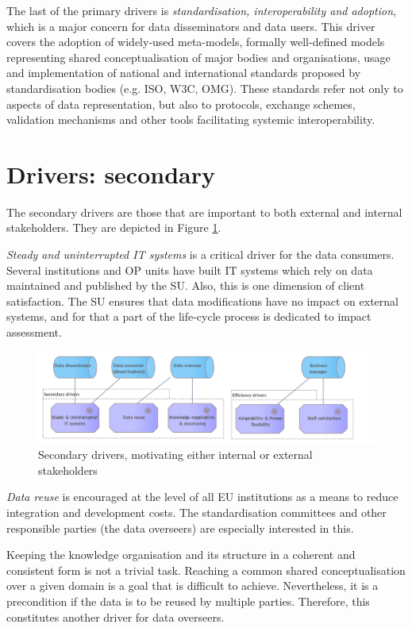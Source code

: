 	The last of the primary drivers is \textit{standardisation, interoperability and adoption}, which is a major concern for data disseminators and data users. This driver covers the adoption of widely-used meta-models, formally well-defined models representing shared conceptualisation of major bodies and organisations, usage and implementation of national and international standards proposed by standardisation bodies (e.g. ISO, W3C, OMG). These standards refer not only to aspects of data representation, but also to protocols, exchange schemes, validation mechanisms and other tools facilitating systemic interoperability. 
	
	\section{Drivers: secondary}
	The secondary drivers are those that are important to both external and internal stakeholders. They are depicted in Figure \ref{fig:secondary drivers}.

	\textit{Steady and uninterrupted IT systems} is a critical driver for the data consumers. Several institutions and OP units have built IT systems which rely on data maintained and published by the SU. Also, this is one dimension of client satisfaction. The SU ensures that data modifications have no impact on external systems, and for that a part of the life-cycle process is dedicated to impact assessment. 
	
	\begin{figure}[h]
		\centering
		\includegraphics[width=1.05\textwidth]{images/motivation/Secondary drivers.png}
		\caption{Secondary drivers, motivating either internal or external stakeholders}
		\label{fig:secondary drivers}
	\end{figure}
	
	\textit{Data reuse} is encouraged at the level of all EU institutions as a means to reduce integration and development costs. The standardisation committees and other responsible parties (the data overseers) are especially interested in this. 
	
	Keeping the knowledge organisation and its structure in a coherent and consistent form is not a trivial task. Reaching a common shared conceptualisation over a given domain is a goal that is difficult to achieve. Nevertheless, it is a precondition if the data is to be reused by multiple parties. Therefore, this constitutes another driver for data overseers. 
	
